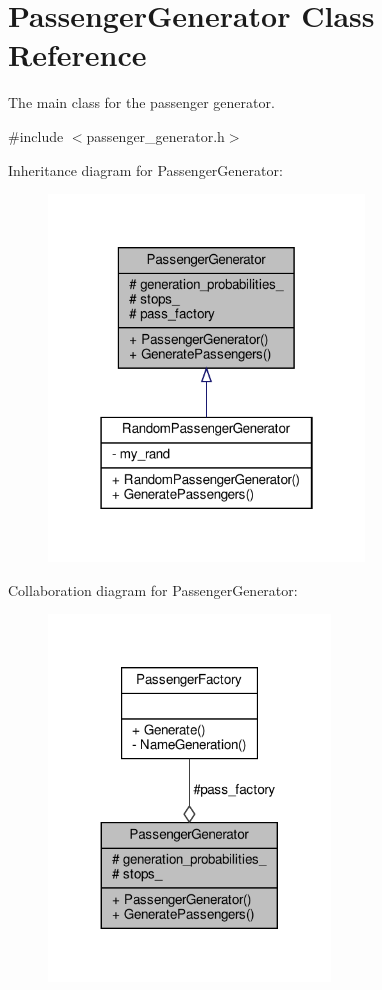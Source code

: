 \hypertarget{classPassengerGenerator}{}\section{Passenger\+Generator Class Reference}
\label{classPassengerGenerator}


The main class for the passenger generator.  




{\ttfamily \#include $<$passenger\+\_\+generator.\+h$>$}



Inheritance diagram for Passenger\+Generator\+:\nopagebreak
\begin{figure}[H]
\begin{center}
\leavevmode
\includegraphics[width=238pt]{classPassengerGenerator__inherit__graph}
\end{center}
\end{figure}


Collaboration diagram for Passenger\+Generator\+:\nopagebreak
\begin{figure}[H]
\begin{center}
\leavevmode
\includegraphics[width=212pt]{classPassengerGenerator__coll__graph}
\end{center}
\end{figure}
